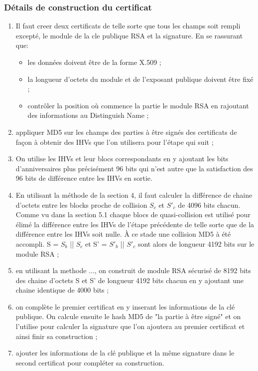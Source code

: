 \documentclass[a4paper,11pt,french]{article}
\begin{document}
\subsubsection{Détails de construction du certificat}
\begin{enumerate}
\item Il faut creer deux certificats de telle sorte que tous les champs soit rempli excepté, le module de la cle publique RSA et la signature. En se rassurant que:
 \begin{itemize} 
 \item les données doivent être de la forme X.509 ;
 \item la longueur d'octets du module et de l'exposant publique doivent être fixé ;
 \item contrôler la position où commence la partie le module RSA en rajoutant des informations au Distinguish Name ;
\end{itemize}
\item appliquer MD5 sur les champs des parties à être signés des certificats de façon à obtenir des IHVs que l'on utilisera pour l'étape qui suit ;
\item On utilise les IHVs et leur blocs correspondants en y ajoutant les bits d'anniversaires plus précisément 96 bits qui n'est autre que la satisfaction des 96 bits de différence entre les IHVs en sortie.
\item En utilisant la méthode de la section 4, il faut calculer la différence de chaine d'octets entre les blocks proche de collision $S_{c}$ et $S'_{c}$ de 4096 bits chacun. Comme vu dans la section 5.1 chaque blocs de quasi-collision est utilisé pour élimé la différence entre les IHVs de l'étape précédente de telle sorte que de la différence entre les IHVs soit nulle. À ce stade une collision MD5 à été accompli. S = $S_{b}$ || $S_{c}$ et S' = $S'_{b}$ || $S'_{c}$ sont alors de longueur 4192 bits sur le module RSA ;
\item en utilisant la methode ..., on construit de module RSA sécurisé de 8192 bits des chaine d'octets S et S' de longueur 4192 bits chacun en y ajoutant une chaine identique de 4000 bits ;
\item on complète le premier certificat en y inserant les informations de la clé publique. On calcule ensuite le hash MD5 de "la partie à être signé" et on l'utilise pour calculer la signature que l'on ajoutera au premier certificat et ainsi finir sa construction ;
\item ajouter les informations de la clé publique et la même signature dans le second certificat pour compléter sa construction.	
\end{enumerate}
\vspace{.5cm}
\end{document}
